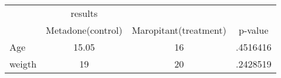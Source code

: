 \begin{tabular}{l*{3}{c}}
\hline\hline
            &     results&            &            \\
            &Metadone(control)&Maropitant(treatment)&     p-value\\
\hline
Age         &       15.05&          16&    .4516416\\
weigth      &          19&          20&    .2428519\\
\hline\hline
\end{tabular}
